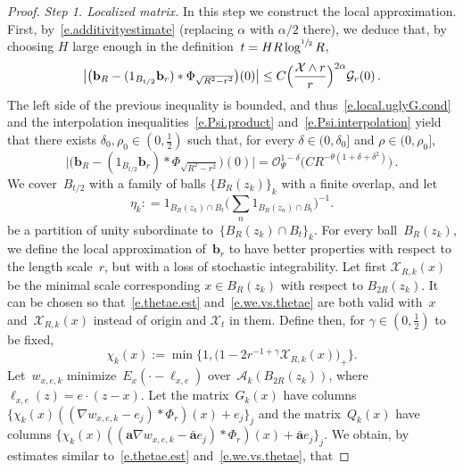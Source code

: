 \documentclass[11pt]{article} %
\numberwithin{equation}{section}
\theoremstyle{definition}
\renewcommand{\b}{\ensuremath{\mathbf{b}}}
\renewcommand{\a}{\mathbf{a}}
\newcommand{\ahom}{\bar{\a}}
\newcommand{\X}{\mathcal{X}}
\renewcommand{\O}{\mathcal{O}}
\newcommand{\indc}{1}
\newcommand{\minscale}{\chi}
\newcommand{\A}{\mathcal{A}}
\begin{document}
\begin{proof}
\emph{Step 1. Localized matrix.} In this step we construct the local approximation. First, by~\eqref{e.additivityestimate} (replacing $\alpha$ with $\alpha/2$ there), we deduce that, by choosing $H$ large enough in the definition~$t = H R \log^{\sfrac 12} R$, 
\begin{align}
\label{e.additivityestimate.again.prepre}
\big|
\bigl( \b_{R} - (\indc_{B_{t/2}}   \b_{r} ) \ast \Phi_{\sqrt{R^2-r^2}} \bigr)(0)
\big|
\leq
C
\Bigl( \frac{\X \wedge r}{r} \Bigr)^{2\alpha} 
 \mathcal{G}_{r}(0) 
\,.
\end{align}
The left side of the previous inequality is bounded, and thus~\eqref{e.local.uglyG.cond} and the interpolation inequalities~\eqref{e.Psi.product} and~\eqref{e.Psi.interpolation} yield that there exists $\delta_0,\rho_0 \in (0,\frac12)$ such that, for every $\delta \in (0,\delta_0]$ and $\rho \in (0,\rho_0]$, 
\begin{equation}
\label{e.additivityestimate.again.pre}
\big|
\bigl( \b_{R} - (\indc_{B_{t/2}}   \b_{r} ) \ast \Phi_{\sqrt{R^2-r^2}} \bigr)(0)
\big|
=
\O_\Psi^{1-\delta} \bigl( C R^{-\theta(1+\delta + \delta^2)} \bigr)  
\,.
\end{equation}
We cover~$B_{t/2}$ 
with a family of balls $\{B_R(z_k)\}_k$ with a finite overlap, and let 
\begin{equation} \label{e.localization.eta}
\eta_k : = \indc_{B_R(z_k) \cap B_t} \biggl( \sum_n \indc_{B_R(z_n) \cap B_t}  \biggr)^{-1}.
\end{equation}
be a partition of unity subordinate to~$\{B_R(z_k)  \cap B_t\}_k$. For every ball~$B_R(z_k)$, we define the local approximation of~$\b_r$ to have better properties with respect to the length scale~$r$, but with a loss of stochastic integrability. Let first $\X_{R,k}(x)$ be the minimal scale corresponding $x\in B_R(z_k)$ with respect to $B_{2R}(z_k)$. It can be chosen so that~\eqref{e.thetae.est} and~\eqref{e.we.vs.thetae} are both valid with~$x$ and~$\X_{R,k}(x)$ instead of origin and $\X_t$ in them. Define then, for $\gamma \in (0,\frac12)$ to be fixed, 
\begin{equation*}  
\minscale_{k}(x) := \min\big\{1, \bigl(1  - 2 r^{-1+\gamma} \X_{R,k}(x) \bigr)_+ \big\} .
\end{equation*}
Let~$w_{x,e,k}$ minimize~$E_x( \cdot - \ell_{x,e})$ over~$\A_k(B_{2R}(z_k))$, where $\ell_{x,e}(z) = e \cdot (z-x)$. Let the matrix~$G_{k}(x)$ have columns~$ \{\minscale_{k}(x) ( (\nabla w_{x,e,k} - e_j) \ast \Phi_{r})(x) + e_j \}_j$ and the matrix~$Q_{k}(x)$ have columns $ \{\minscale_{k}(x)  ( (\a \nabla w_{x,e,k} - \ahom e_j) \ast \Phi_{r}) (x) + \ahom e_j\}_j$. We obtain, by estimates similar to~\eqref{e.thetae.est} and~\eqref{e.we.vs.thetae}, that

\end{proof}
\end{document}

